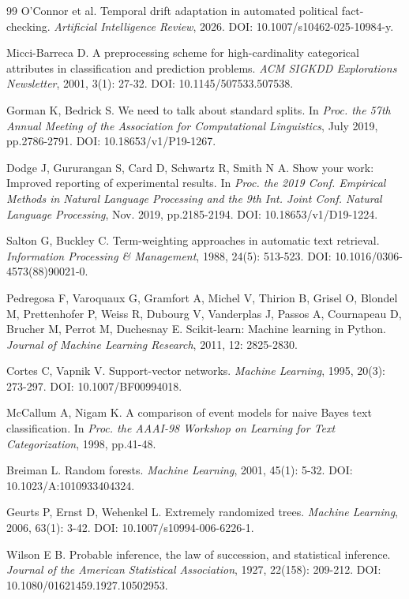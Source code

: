 \documentclass[10pt,twocolumn,twoside,a4paper]{article}
\begin{document}
\begin{thebibliography}{99}
O'Connor et al. Temporal drift adaptation in automated political fact-checking.
\emph{Artificial Intelligence Review}, 2026. DOI: 10.1007/s10462-025-10984-y.

Micci-Barreca D. A preprocessing scheme for high-cardinality categorical
attributes in classification and prediction problems. \emph{ACM SIGKDD
Explorations Newsletter}, 2001, 3(1): 27-32. DOI: 10.1145/507533.507538.

Gorman K, Bedrick S. We need to talk about standard splits. In \emph{Proc. the
57th Annual Meeting of the Association for Computational Linguistics}, July
2019, pp.2786-2791. DOI: 10.18653/v1/P19-1267.

Dodge J, Gururangan S, Card D, Schwartz R, Smith N A. Show your work: Improved
reporting of experimental results. In \emph{Proc. the 2019 Conf. Empirical
Methods in Natural Language Processing and the 9th Int. Joint Conf. Natural
Language Processing}, Nov. 2019, pp.2185-2194. DOI: 10.18653/v1/D19-1224.

Salton G, Buckley C. Term-weighting approaches in automatic text retrieval.
\emph{Information Processing \& Management}, 1988, 24(5): 513-523.
DOI: 10.1016/0306-4573(88)90021-0.

Pedregosa F, Varoquaux G, Gramfort A, Michel V, Thirion B, Grisel O, Blondel M,
Prettenhofer P, Weiss R, Dubourg V, Vanderplas J, Passos A, Cournapeau D,
Brucher M, Perrot M, Duchesnay E. Scikit-learn: Machine learning in Python.
\emph{Journal of Machine Learning Research}, 2011, 12: 2825-2830.

Cortes C, Vapnik V. Support-vector networks. \emph{Machine Learning}, 1995,
20(3): 273-297. DOI: 10.1007/BF00994018.

McCallum A, Nigam K. A comparison of event models for naive Bayes text
classification. In \emph{Proc. the AAAI-98 Workshop on Learning for Text
Categorization}, 1998, pp.41-48.

Breiman L. Random forests. \emph{Machine Learning}, 2001, 45(1): 5-32.
DOI: 10.1023/A:1010933404324.

Geurts P, Ernst D, Wehenkel L. Extremely randomized trees. \emph{Machine
Learning}, 2006, 63(1): 3-42. DOI: 10.1007/s10994-006-6226-1.

Wilson E B. Probable inference, the law of succession, and statistical
inference. \emph{Journal of the American Statistical Association}, 1927,
22(158): 209-212. DOI: 10.1080/01621459.1927.10502953.

\end{thebibliography}
\end{document}

